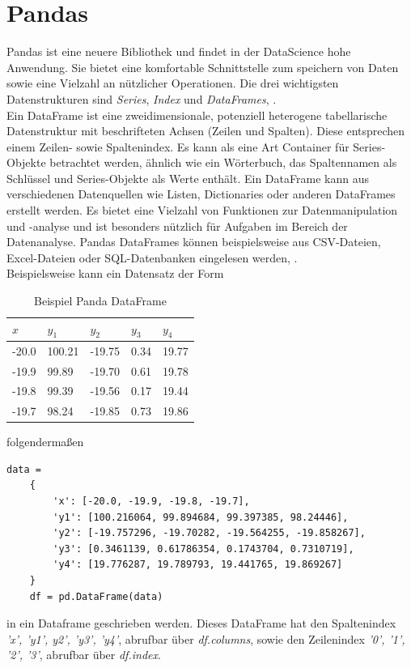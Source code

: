 \section{Pandas}
 Pandas ist eine neuere Bibliothek und findet in der DataScience hohe Anwendung.  Sie bietet eine komfortable Schnittstelle zum speichern von Daten sowie eine Vielzahl an nützlicher Operationen. Die drei wichtigsten Datenstrukturen sind \textit{Series}, \textit{Index} und \textit{DataFrames}, \cite{VanderPlas:2023}.\\
 Ein DataFrame ist eine zweidimensionale, potenziell heterogene tabellarische Datenstruktur mit beschrifteten Achsen (Zeilen und Spalten). Diese entsprechen einem Zeilen- sowie Spaltenindex. Es kann als eine Art Container für Series-Objekte betrachtet werden, ähnlich wie ein Wörterbuch, das Spaltennamen als Schlüssel und Series-Objekte als Werte enthält. Ein DataFrame kann aus verschiedenen Datenquellen wie Listen, Dictionaries oder anderen DataFrames erstellt werden. Es bietet eine Vielzahl von Funktionen zur Datenmanipulation und -analyse und ist besonders nützlich für Aufgaben im Bereich der Datenanalyse. Pandas DataFrames können beispielsweise aus CSV-Dateien, Excel-Dateien oder SQL-Datenbanken eingelesen werden, \cite{VanderPlas:2023}. \\
 Beispielsweise kann ein Datensatz der Form 
 \begin{table}[H]
 	\small
 	\centering
 	\begin{tabular}{p{1.5cm}|p{1.5cm}|p{1.5cm}|p{1.5cm}|p{1.5cm}}
 		$x$ & $y_1$ & $y_2$ & $y_3$ & $y_4$ \\ \hline
 		-20.0 & 100.21 & -19.75 & 0.34 & 19.77 \\
 		-19.9 & 99.89 & -19.70 & 0.61 & 19.78 \\
 		-19.8 & 99.39 & -19.56 & 0.17 & 19.44 \\
 		-19.7 & 98.24 & -19.85 & 0.73 & 19.86 \\
 	\end{tabular}
 	\caption{Beispiel Panda DataFrame}
 	\label{tab:Pandas DF}
 \end{table}
 folgendermaßen
 \begin{lstlisting}[caption={Pandas Dataframe}, captionpos=b, label={lst:Dataframe}]
	data = 
	{
		'x': [-20.0, -19.9, -19.8, -19.7],
		'y1': [100.216064, 99.894684, 99.397385, 98.24446],
		'y2': [-19.757296, -19.70282, -19.564255, -19.858267],
		'y3': [0.3461139, 0.61786354, 0.1743704, 0.7310719],
		'y4': [19.776287, 19.789793, 19.441765, 19.869267]
	}
	df = pd.DataFrame(data)
 \end{lstlisting}
 in ein Dataframe geschrieben werden. Dieses DataFrame hat den Spaltenindex \textit{'x', 'y1', y2', 'y3', 'y4'}, abrufbar über \textit{df.columns}, sowie den Zeilenindex \textit{'0', '1', '2', '3'}, abrufbar über \textit{df.index}.\\
 
